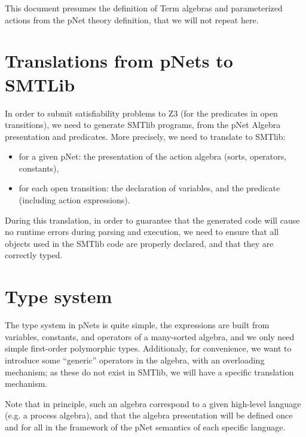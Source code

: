 \documentclass[a4paper]{lncs/llncs}
\begin{document}
This document presumes the definition of Term algebras and
parameterized actions from the pNet
theory definition, that we will not repeat here.

\section{Translations from pNets to SMTLib}
In order to submit satisfiability problems to Z3 (for the predicates
in open transitions), we need to generate SMTlib programs, from the
pNet Algebra presentation and predicates.
More precisely, we need to translate to SMTlib:
\begin{itemize}
  \item for a given pNet: the presentation of the action algebra
    (sorts, operators, constants), 
    \item for each open transition: the declaration of variables, and
      the predicate (including action expressions).
\end{itemize}

During this translation, in order to guarantee that the generated code
will cause no runtime errors during parsing and execution, we need
to ensure that all objects used in the SMTlib code are properly
declared, and that they are correctly typed.


\section{Type system}
The type system in pNets is quite simple, the expressions are built
from variables, constants, and operators of a many-sorted algebra, and
we only need simple first-order polymorphic types.
Additionaly, for convenience, we want to introduce some ``generic''
operators in the algebra, with an overloading mechanism; as these do
not exist in SMTlib, we will have a specific translation mechanism.

Note that in principle, such an algebra correspond to a given
high-level language (e.g. a process algebra), and that the algebra
presentation will be defined once and for all in the framework of the
pNet semantics of each specific language.
\end{document}
